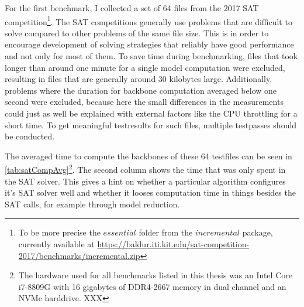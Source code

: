 For the first benchmark, I collected a set of 64 files from the 2017 SAT competition\footnote{
To be more precise the $essential$ folder from the $incremental$ package, currently available at \url{https://baldur.iti.kit.edu/sat-competition-2017/benchmarks/incremental.zip}
}. The SAT competitions generally use problems that are difficult to solve compared to other problems of the same file size. This is in order to encourage development of solving strategies that reliably have good performance and not only for most of them. To save time during benchmarking, files that took longer than around one minute for a single model computation were excluded, resulting in files that are generally around 30 kilobytes large. Additionally, problems where the duration for backbone computation averaged below one second were excluded, because here the small differences in the measurements could just as well be explained with external factors like the CPU throttling for a short time. To get meaningful testresults for such files, multiple testpasses should be conducted.

The averaged time to compute the backbones of these 64 testfiles can be seen in \ref{tab:satCompAvg}\footnote{
	The hardware used for all benchmarks listed in this thesis was an Intel Core i7-8809G with 16 gigabytes of DDR4-2667 memory in dual channel and an NVMe harddrive. XXX
}. The second column shows the time that was only spent in the SAT solver. This gives a hint on whether a particular algorithm configures it's SAT solver well and whether it looses computation time in things besides the SAT calls, for example through model reduction.

